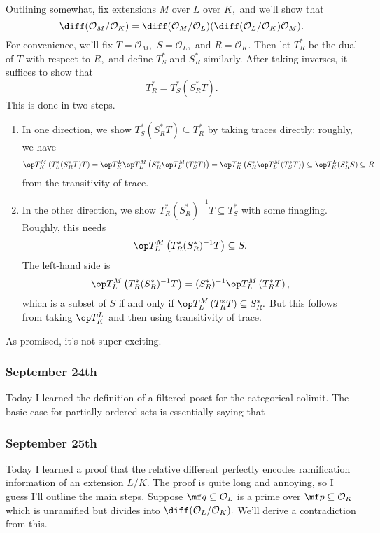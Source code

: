 Outlining somewhat, fix extensions $M$ over $L$ over $K,$ and we'll show that
\[\diff(\mathcal O_M/\mathcal O_K)=\diff(\mathcal O_M/\mathcal O_L)(\diff(\mathcal O_L/\mathcal O_K)\mathcal O_M).\]
For convenience, we'll fix $T=\mathcal O_M,$ $S=\mathcal O_L,$ and $R=\mathcal O_K.$ Then let $T^*_R$ be the dual of $T$ with respect to $R,$ and define $T_S^*$ and $S_R^*$ similarly. After taking inverses, it suffices to show that
\[T_R^*=T_S^*(S_R^*T).\]
This is done in two steps.
\begin{enumerate}[label=\arabic*.]
    \item In one direction, we show $T_S^*(S_R^*T)\subseteq T_R^*$ by taking traces directly:
    roughly, we have
    \[\op T_K^M\left(T_S^*(S_R^*T)T\right)=\op T_K^L\op T_L^M\left(S_R^*\op T_L^M(T^*_ST)\right)=\op T_K^L\left(S_R^*\op T_L^M(T^*_ST)\right)\subseteq\op T_K^L(S_R^*S)\subseteq R\]
    from the transitivity of trace.
    
    \item In the other direction, we show $T_R^*(S_R^*)^{-1}T\subseteq T_S^*$ with some finagling. Roughly, this needs
    \[\op T_L^M\left(T_R^*(S_R^*)^{-1}T\right)\subseteq S.\]
    The left-hand side is
    \[\op T_L^M\left(T_R^*(S_R^*)^{-1}T\right)=(S_R^*)^{-1}\op T_L^M\left(T_R^*T\right),\]
    which is a subset of $S$ if and only if $\op T_L^M\left(T_R^*T\right)\subseteq S_R^*.$ But this follows from taking $\op T_K^L$ and then using transitivity of trace.
\end{enumerate}
As promised, it's not super exciting.

\subsubsection{September 24th}
Today I learned the definition of a filtered poset for the categorical colimit. The basic case for partially ordered sets is essentially saying that 

\subsubsection{September 25th}
Today I learned a proof that the relative different perfectly encodes ramification information of an extension $L/K.$ The proof is quite long and annoying, so I guess I'll outline the main steps. Suppose $\mf q\subseteq\mathcal O_L$ is a prime over $\mf p\subseteq\mathcal O_K$ which is unramified but divides into $\diff(\mathcal O_L/\mathcal O_K).$ We'll derive a contradiction from this.

